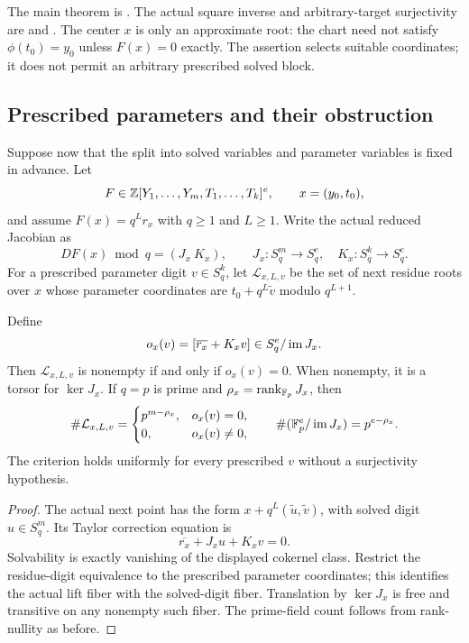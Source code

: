 The main theorem is
.
The actual square inverse and arbitrary-target surjectivity are
 and
.
The center $x$ is only an approximate root: the chart need not satisfy
$\phi(t_0)=y_0$ unless $F(x)=0$ exactly. The assertion selects suitable
coordinates; it does not permit an arbitrary prescribed solved block.

\subsection{Prescribed parameters and their obstruction}

Suppose now that the split into solved variables and parameter variables
is fixed in advance. Let
\[
 F\in\mathbb Z[Y_1,\ldots,Y_m,T_1,\ldots,T_k]^e,\qquad x=(y_0,t_0),
\]
and assume $F(x)=q^Lr_x$ with $q\ge1$ and $L\ge1$. Write the actual
reduced Jacobian as
\[
 DF(x)\bmod q=(J_x\ K_x),\qquad
 J_x:S_q^m\to S_q^e,\quad K_x:S_q^k\to S_q^e.
\]
For a prescribed parameter digit $v\in S_q^k$, let $\mathcal L_{x,L,v}$
be the set of next residue roots over $x$ whose parameter coordinates are
$t_0+q^L\widetilde v$ modulo $q^{L+1}$.

\begin{theorem}
\label{thm:prescribed-obstruction}
Define
\[
 o_x(v)=[\overline{r_x}+K_xv]\in S_q^e/\operatorname{im} J_x.
\]
Then $\mathcal L_{x,L,v}$ is nonempty if and only if $o_x(v)=0$.
When nonempty, it is a torsor for $\ker J_x$. If $q=p$ is prime and
$\rho_x=\operatorname{rank}_{\mathbb F_p}J_x$, then
\begin{equation}\label{eq:prescribed-count}
 \#\mathcal L_{x,L,v}
 =\begin{cases}p^{m-\rho_x},&o_x(v)=0,\\0,&o_x(v)\ne0,\end{cases}
 \qquad \#(\mathbb F_p^e/\operatorname{im} J_x)=p^{e-\rho_x}.
\end{equation}
The criterion holds uniformly for every prescribed $v$ without a
surjectivity hypothesis.
\end{theorem}

\begin{proof}
The actual next point has the form
$x+q^L(\widetilde u,\widetilde v)$, with solved digit $u\in S_q^m$.
Its Taylor correction equation is
\[
 \overline{r_x}+J_xu+K_xv=0.
\]
Solvability is exactly vanishing of the displayed cokernel class. Restrict
the residue-digit equivalence to the prescribed parameter coordinates;
this identifies the actual lift fiber with the solved-digit fiber.
Translation by $\ker J_x$ is free and transitive on any nonempty such
fiber. The prime-field count follows from rank-nullity as before.
\end{proof}

